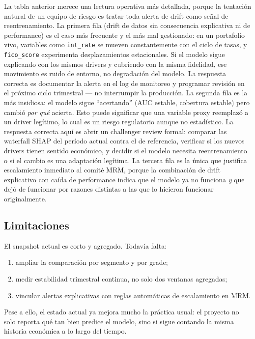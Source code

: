 \documentclass[
  spanish,
  11pt,
  letterpaper,
]{scrbook}
\providecommand{\tightlist}{%
  \setlength{\itemsep}{0pt}\setlength{\parskip}{0pt}}
\theoremstyle{plain}
\theoremstyle{remark}
\begin{document}
La tabla anterior merece una lectura operativa más detallada, porque la
tentación natural de un equipo de riesgo es tratar toda alerta de drift
como señal de reentrenamiento. La primera fila (drift de datos sin
consecuencia explicativa ni de performance) es el caso más frecuente y
el más mal gestionado: en un portafolio vivo, variables como
\texttt{int\_rate} se mueven constantemente con el ciclo de tasas, y
\texttt{fico\_score} experimenta desplazamientos estacionales. Si el
modelo sigue explicando con los mismos drivers y cubriendo con la misma
fidelidad, ese movimiento es ruido de entorno, no degradación del
modelo. La respuesta correcta es documentar la alerta en el log de
monitoreo y programar revisión en el próximo ciclo trimestral --- no
interrumpir la producción. La segunda fila es la más insidiosa: el
modelo sigue ``acertando'' (AUC estable, cobertura estable) pero cambió
\emph{por qué} acierta. Esto puede significar que una variable proxy
reemplazó a un driver legítimo, lo cual es un riesgo regulatorio aunque
no estadístico. La respuesta correcta aquí es abrir un challenger review
formal: comparar las waterfall SHAP del período actual contra el de
referencia, verificar si los nuevos drivers tienen sentido económico, y
decidir si el modelo necesita reentrenamiento o si el cambio es una
adaptación legítima. La tercera fila es la única que justifica
escalamiento inmediato al comité MRM, porque la combinación de drift
explicativo con caída de performance indica que el modelo ya no funciona
\emph{y} que dejó de funcionar por razones distintas a las que lo
hicieron funcionar originalmente.

\subsection{Limitaciones}\label{limitaciones-1}

El snapshot actual es corto y agregado. Todavía falta:

\begin{enumerate}
\def\labelenumi{\arabic{enumi}.}
\tightlist
\item
  ampliar la comparación por segmento y por grade;
\item
  medir estabilidad trimestral continua, no solo dos ventanas agregadas;
\item
  vincular alertas explicativas con reglas automáticas de escalamiento
  en MRM.
\end{enumerate}

Pese a ello, el estado actual ya mejora mucho la práctica usual: el
proyecto no solo reporta qué tan bien predice el modelo, sino si sigue
contando la misma historia económica a lo largo del tiempo.
\end{document}
